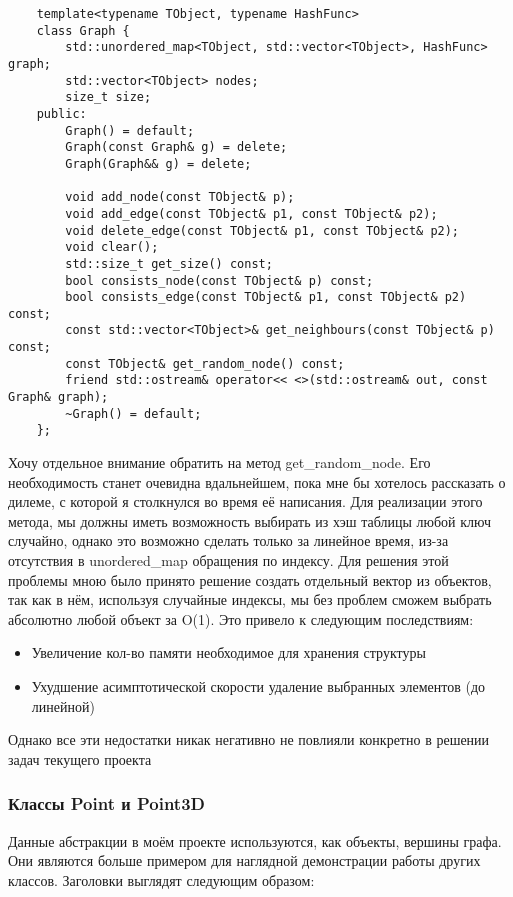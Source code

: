 \begin{verbatim}
    template<typename TObject, typename HashFunc>
    class Graph {
        std::unordered_map<TObject, std::vector<TObject>, HashFunc> graph;
        std::vector<TObject> nodes;
        size_t size;
    public:
        Graph() = default;
        Graph(const Graph& g) = delete;
        Graph(Graph&& g) = delete;

        void add_node(const TObject& p);
        void add_edge(const TObject& p1, const TObject& p2);
        void delete_edge(const TObject& p1, const TObject& p2);
        void clear();
        std::size_t get_size() const;
        bool consists_node(const TObject& p) const;
        bool consists_edge(const TObject& p1, const TObject& p2) const;
        const std::vector<TObject>& get_neighbours(const TObject& p) const;
        const TObject& get_random_node() const;
        friend std::ostream& operator<< <>(std::ostream& out, const Graph& graph);
        ~Graph() = default;
    };
\end{verbatim}
Хочу отдельное внимание обратить на метод get\_random\_node. Его необходимость 
станет очевидна вдальнейшем, пока мне бы хотелось рассказать о дилеме, с которой я столкнулся
во время её написания. Для реализации этого метода, мы должны иметь возможность выбирать из хэш таблицы
любой ключ случайно, однако это возможно сделать только за линейное время, из-за отсутствия в 
unordered\_map обращения по индексу. Для решения этой проблемы мною было принято решение создать отдельный
вектор из объектов, так как в нём, используя случайные индексы, мы без проблем сможем выбрать 
абсолютно любой объект за O(1). 
Это привело к следующим последствиям:
\begin{itemize}
    \item Увеличение кол-во памяти необходимое для хранения структуры
    \item Ухудшение асимптотической скорости удаление выбранных элементов (до линейной)
\end{itemize}
Однако все эти недостатки никак негативно не повлияли конкретно в решении задач текущего проекта 


\subsubsection{Классы Point и Point3D}

Данные абстракции в моём проекте используются, как объекты, вершины графа. 
Они являются больше примером для наглядной демонстрации работы других классов.
Заголовки выглядят следующим образом:


